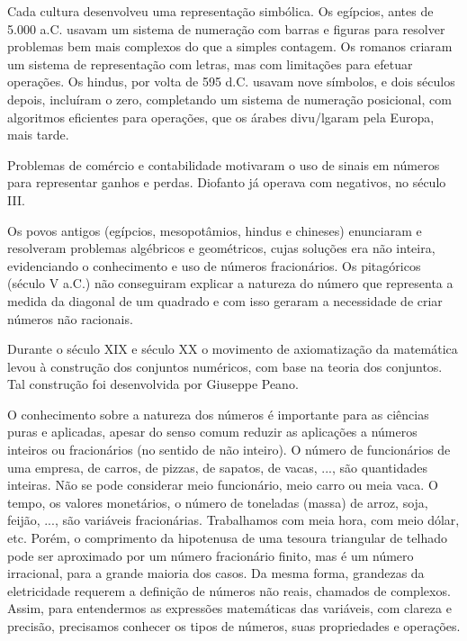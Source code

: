 \documentclass[12pt]{article}
\renewcommand{\_}{\kern-1.5pt\textunderscore\kern-1.5pt}
\begin{document}
Cada cultura desenvolveu uma representação simbólica. Os egípcios, antes de 5.000 a.C. usavam um sistema de numeração com barras e figuras para resolver problemas bem mais complexos do que a simples contagem. Os romanos criaram um sistema de representação com letras, mas com limitações para efetuar operações. Os hindus, por volta de 595 d.C. usavam nove símbolos, e dois séculos depois, incluíram o zero, completando um sistema de numeração posicional, com algoritmos eficientes para operações, que os árabes divu/lgaram pela Europa, mais tarde. \par

Problemas de comércio e contabilidade motivaram o uso de sinais em números para representar ganhos e perdas. Diofanto já operava com negativos, no século III. \par

Os povos antigos (egípcios, mesopotâmios, hindus e chineses) enunciaram e resolveram problemas algébricos e geométricos, cujas soluções era não inteira, evidenciando o conhecimento e uso de números fracionários. Os pitagóricos (século V a.C.) não conseguiram explicar a natureza do número que representa a medida da diagonal de um quadrado e com isso geraram a necessidade de criar números não racionais. \par

Durante o século XIX e século XX o movimento de axiomatização da matemática levou à construção dos conjuntos numéricos, com base na teoria dos conjuntos. Tal construção foi desenvolvida por Giuseppe Peano. \par

O conhecimento sobre a natureza dos números é importante para as ciências puras e aplicadas, apesar do senso comum reduzir as aplicações a números inteiros ou fracionários (no sentido de não inteiro). O número de funcionários de uma empresa, de carros, de pizzas, de sapatos, de vacas, ..., são quantidades inteiras. Não se pode considerar meio funcionário, meio carro ou meia vaca. O tempo, os valores monetários, o número de toneladas (massa) de arroz, soja, feijão, ..., são variáveis fracionárias. Trabalhamos com meia hora, com meio dólar, etc. Porém, o comprimento da hipotenusa de uma tesoura triangular de telhado pode ser aproximado por um número fracionário finito, mas é um número irracional, para a grande maioria dos casos. Da mesma forma, grandezas da eletricidade requerem a definição de números não reais, chamados de complexos. Assim, para entendermos as expressões matemáticas das variáveis, com clareza e precisão, precisamos conhecer os tipos de números, suas propriedades e operações.\par
\end{document}
